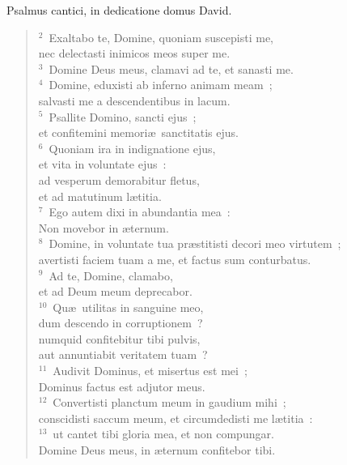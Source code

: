 \bchapter
\lettrine[lines=3,image=true,loversize=0.05,lraise=-0.03]{P}{}salmus cantici, in dedicatione domus David.
\begin{flushleft}\begin{verse}\vspace{6pt}${}^{2}$~Exaltabo te, Domine, quoniam suscepisti me,\\ nec delectasti inimicos meos super me.\\
${}^{3}$~Domine Deus meus, clamavi ad te, et sanasti me.\\
${}^{4}$~Domine, eduxisti ab inferno animam meam~;\\ salvasti me a descendentibus in lacum.\\
${}^{5}$~Psallite Domino, sancti ejus~;\\ et confitemini memori\ae\ sanctitatis ejus.\\
${}^{6}$~Quoniam ira in indignatione ejus,\\ et vita in voluntate ejus~:\\ ad vesperum demorabitur fletus,\\ et ad matutinum l\ae titia.\\
${}^{7}$~Ego autem dixi in abundantia mea~:\\ Non movebor in \ae ternum.\\
${}^{8}$~Domine, in voluntate tua pr\ae stitisti decori meo virtutem~;\\ avertisti faciem tuam a me, et factus sum conturbatus.\\
${}^{9}$~Ad te, Domine, clamabo,\\ et ad Deum meum deprecabor.\\
${}^{10}$~Qu\ae\ utilitas in sanguine meo,\\ dum descendo in corruptionem~?\\ numquid confitebitur tibi pulvis,\\ aut annuntiabit veritatem tuam~?\\
${}^{11}$~Audivit Dominus, et misertus est mei~;\\ Dominus factus est adjutor meus.\\
${}^{12}$~Convertisti planctum meum in gaudium mihi~;\\ conscidisti saccum meum, et circumdedisti me l\ae titia~:\\
${}^{13}$~ut cantet tibi gloria mea, et non compungar.\\ Domine Deus meus, in \ae ternum confitebor tibi.\end{verse}\end{flushleft}



